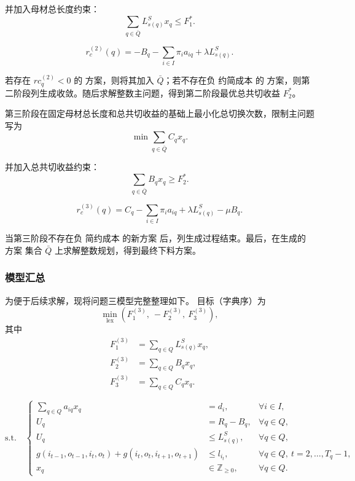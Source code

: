 \documentclass[UTF8]{ctexart}
\begin{document}
并加入母材总长度约束：
\begin{equation}
\sum_{q\in \bar Q}L_{s(q)}^Sx_q\leq F_1^*.
\label{eq:p3_F1constraint}
\end{equation}

\begin{equation}
r_c^{(2)}(q) = -B_q - \sum_{i\in I}\pi_i a_{iq} + \lambda L_{s(q)}^S.
\label{eq:rc2}
\end{equation}

若存在 $rc_q^{(2)}<0$ 的 方案，则将其加入 $\bar Q$；若不存在负 约简成本 的 方案，则第二阶段列生成收敛。随后求解整数主问题，得到第二阶段最优总共切收益 $F_2^*$。

第三阶段在固定母材总长度和总共切收益的基础上最小化总切换次数，限制主问题写为
\begin{equation}
\min \sum_{q\in \bar Q}C_qx_q.
\label{eq:p3_master_phase3}
\end{equation}

并加入总共切收益约束：
\begin{equation}
\sum_{q\in \bar Q}B_qx_q\geq F_2^*.
\label{eq:p3_F2constraint}
\end{equation}

\begin{equation}
r_c^{(3)}(q) = C_q - \sum_{i\in I}\pi_i a_{iq} + \lambda L_{s(q)}^S - \mu B_q.
\label{eq:rc3}
\end{equation}

当第三阶段不存在负 简约成本 的新方案 后，列生成过程结束。最后，在生成的 方案 集合 $\bar Q$ 上求解整数规划，得到最终下料方案。

\subsubsection{模型汇总}

为便于后续求解，现将问题三模型完整整理如下。
目标（字典序）为
\begin{equation}
\min_{\mathrm{lex}}\left(F_1^{(3)},\ -F_2^{(3)},\ F_3^{(3)}\right),
\end{equation}
其中
\begin{align}
F_1^{(3)} &= \sum_{q\in Q} L_{s(q)}^S x_q,\\
F_2^{(3)} &= \sum_{q\in Q} B_q x_q,\\
F_3^{(3)} &= \sum_{q\in Q} C_q x_q.
\end{align}

\begin{equation}
	\mathrm{s.t.}\quad
\left\{
\begin{aligned}
\sum_{q\in Q} a_{iq} x_q &= d_i, &\forall i\in I,\\
U_q &= R_q - B_q, &\forall q\in Q,\\
U_q &\le L_{s(q)}^S, &\forall q\in Q,\\
g(i_{t-1},o_{t-1},i_t,o_t)+g(i_t,o_t,i_{t+1},o_{t+1}) &\le l_{i_t}, &\forall q\in Q,\ t=2,\ldots,T_q-1,\\
x_q &\in \mathbb{Z}_{\ge 0}, &\forall q\in Q.
\end{aligned}
\right.
\end{equation}
\end{document}
